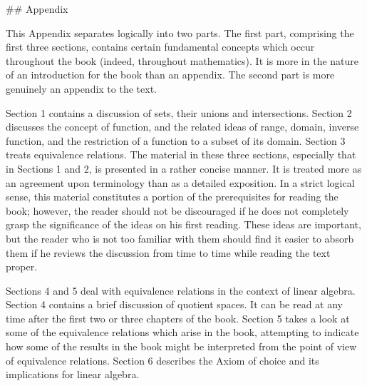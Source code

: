 

## Appendix

This Appendix separates logically into two parts. The first part, comprising the first three sections, contains certain fundamental concepts which occur throughout the book (indeed, throughout mathematics). It is more in the nature of an introduction for the book than an appendix. The second part is more genuinely an appendix to the text.

Section 1 contains a discussion of sets, their unions and intersections. Section 2 discusses the concept of function, and the related ideas of range, domain, inverse function, and the restriction of a function to a subset of its domain. Section 3 treats equivalence relations. The material in these three sections, especially that in Sections 1 and 2, is presented in a rather concise manner. It is treated more as an agreement upon terminology than as a detailed exposition. In a strict logical sense, this material constitutes a portion of the prerequisites for reading the book; however, the reader should not be discouraged if he does not completely grasp the significance of the ideas on his first reading. These ideas are important, but the reader who is not too familiar with them should find it easier to absorb them if he reviews the discussion from time to time while reading the text proper.

Sections 4 and 5 deal with equivalence relations in the context of linear algebra. Section 4 contains a brief discussion of quotient spaces. It can be read at any time after the first two or three chapters of the book. Section 5 takes a look at some of the equivalence relations which arise in the book, attempting to indicate how some of the results in the book might be interpreted from the point of view of equivalence relations. Section 6 describes the Axiom of choice and its implications for linear algebra.

